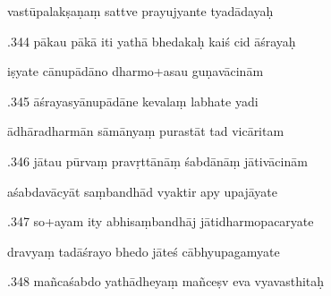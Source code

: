 \documentclass[article,12pt,a4paper]{memoir}%
\newcounter{parCount}
\begin{document}
	  
	  \pstart \leavevmode%
	vastūpalakṣaṇaṃ sattve prayujyante tyadādayaḥ 
	{}
	\pend%
      

	  
	  \pstart {}.344 pākau pākā iti yathā bhedakaḥ kaiś cid āśrayaḥ 
	{}
	\pend%
      

	  
	  \pstart \leavevmode%
	iṣyate cānupādāno dharmo+asau guṇavācinām 
	{}
	\pend%
      

	  
	  \pstart {}.345 āśrayasyānupādāne kevalaṃ labhate yadi 
	{}
	\pend%
      

	  
	  \pstart \leavevmode%
	ādhāradharmān sāmānyaṃ purastāt tad vicāritam 
	{}
	\pend%
      

	  
	  \pstart {}.346 jātau pūrvaṃ pravṛttānāṃ śabdānāṃ jātivācinām 
	{}
	\pend%
      

	  
	  \pstart \leavevmode%
	aśabdavācyāt saṃbandhād vyaktir apy upajāyate 
	{}
	\pend%
      

	  
	  \pstart {}.347 so+ayam ity abhisaṃbandhāj   jātidharmopacaryate 
	{}
	\pend%
      

	  
	  \pstart \leavevmode%
	dravyaṃ tadāśrayo bhedo jāteś cābhyupagamyate 
	{}
	\pend%
      

	  
	  \pstart {}.348 mañcaśabdo yathādheyaṃ mañceṣv eva vyavasthitaḥ 
	{}
	\pend%
      
\end{document}
